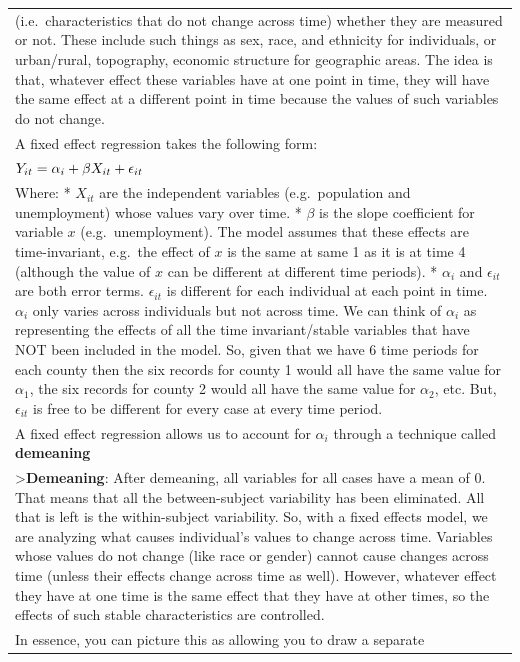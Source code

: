 \documentclass[
  letterpaper,
  DIV=11,
  numbers=noendperiod]{scrreprt}
\begin{document}
\begin{longtable}[]{@{}
  >{\raggedright\arraybackslash}p{}@{}}
(i.e.~characteristics that do not change across time) whether they are
measured or not. These include such things as sex, race, and ethnicity
for individuals, or urban/rural, topography, economic structure for
geographic areas. The idea is that, whatever effect these variables have
at one point in time, they will have the same effect at a different
point in time because the values of such variables do not change. \\
A fixed effect regression takes the following form: \\
\(\huge Y_{it}=\alpha_i+\beta X_{it}+\epsilon_{it}\) \\
Where: * \(X_{it}\) are the independent variables (e.g.~population and
unemployment) whose values vary over time. * \(\beta\) is the slope
coefficient for variable \(x\) (e.g.~unemployment). The model assumes
that these effects are time-invariant, e.g.~the effect of \(x\) is the
same at same 1 as it is at time 4 (although the value of \(x\) can be
different at different time periods). * \(\alpha_i\) and
\(\epsilon_{it}\) are both error terms. \(\epsilon_{it}\) is different
for each individual at each point in time. \(\alpha_i\) only varies
across individuals but not across time. We can think of \(\alpha_i\) as
representing the effects of all the time invariant/stable variables that
have NOT been included in the model. So, given that we have 6 time
periods for each county then the six records for county 1 would all have
the same value for \(\alpha_1\), the six records for county 2 would all
have the same value for \(\alpha_2\), etc. But, \(\epsilon_{it}\) is
free to be different for every case at every time period. \\
A fixed effect regression allows us to account for \(\alpha_i\) through
a technique called \textbf{demeaning} \\
\textgreater{}\textbf{Demeaning}: After demeaning, all variables for all
cases have a mean of 0. That means that all the between-subject
variability has been eliminated. All that is left is the within-subject
variability. So, with a fixed effects model, we are analyzing what
causes individual's values to change across time. Variables whose values
do not change (like race or gender) cannot cause changes across time
(unless their effects change across time as well). However, whatever
effect they have at one time is the same effect that they have at other
times, so the effects of such stable characteristics are controlled. \\
In essence, you can picture this as allowing you to draw a separate

\end{longtable}
\end{document}
